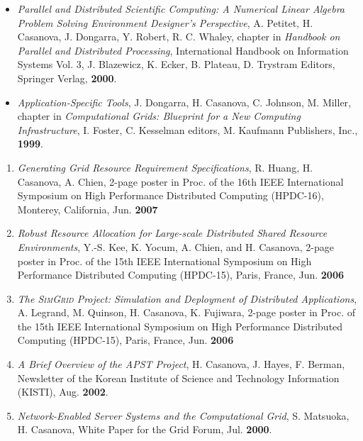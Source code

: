 \begin{itemize}
\item[2.]
{\it Parallel and Distributed Scientific Computing: A Numerical
Linear Algebra Problem Solving Environment Designer's Perspective}, A.
Petitet, H. Casanova, J. Dongarra, Y. Robert, R. C. Whaley, chapter in
\emph{Handbook on Parallel and Distributed Processing}, International
Handbook on Information Systems Vol. 3, J. Blazewicz, K. Ecker,
B. Plateau, D. Trystram Editors, Springer Verlag, {\bf 2000}.

\item[1.]
{\it Application-Specific Tools}, J. Dongarra, H. Casanova, C. Johnson,
M. Miller, chapter in {\it Computational Grids: Blueprint for a New
Computing Infrastructure}, I. Foster, C. Kesselman editors, M. Kaufmann
Publishers, Inc., {\bf 1999}.

\end{itemize}



\begin{enumerate}

\item[5.]
{\it Generating Grid Resource Requirement Specifications},
R. Huang, H. Casanova, A. Chien, 2-page
poster in Proc. of the 16th IEEE International Symposium on High
Performance Distributed Computing (HPDC-16), Monterey, California, Jun. {\bf 2007}


\item[4.]
{\it Robust Resource Allocation for Large-scale Distributed Shared Resource
Environments}, Y.-S. Kee, K. Yocum, A. Chien, and H. Casanova, 2-page
poster in Proc. of the 15th IEEE International Symposium on High
Performance Distributed Computing (HPDC-15), Paris, France, Jun. {\bf 2006}

\item[3.]
{\it The \textsc{SimGrid} Project: Simulation and Deployment of Distributed Applications}, A. Legrand, M. Quinson, H. Casanova, K. Fujiwara, 2-page
poster in Proc. of the 15th IEEE International Symposium on High
Performance Distributed Computing (HPDC-15), Paris, France, Jun. {\bf 2006}

\item[2.]
{\it  A Brief Overview of the APST Project}, H. Casanova, J. Hayes,
F. Berman, Newsletter of the Korean Institute of Science and Technology
Information (KISTI), Aug. {\bf 2002}.

\item[1.]
{\it Network-Enabled Server Systems and the Computational
Grid}, S. Matsuoka, H. Casanova, White Paper for the Grid Forum,
Jul. {\bf 2000}.

\end{enumerate}

